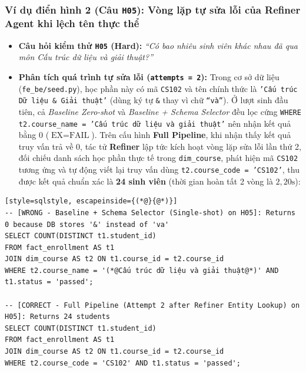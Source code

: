 \documentclass[12pt,a4paper]{report}
\begin{document}
\subsubsection{Ví dụ điển hình 2 (Câu \texttt{H05}): Vòng lặp tự sửa lỗi của Refiner Agent khi lệch tên thực thể}
\begin{itemize}
    \item \textbf{Câu hỏi kiểm thử \texttt{H05} (Hard):} \textit{``Có bao nhiêu sinh viên khác nhau đã qua môn Cấu trúc dữ liệu và giải thuật?''}
    \item \textbf{Phân tích quá trình tự sửa lỗi (\texttt{attempts = 2}):} Trong cơ sở dữ liệu (\texttt{fe\_be/seed.py}), học phần này có mã \texttt{CS102} và tên chính thức là \texttt{'Cấu trúc Dữ liệu \& Giải thuật'} (dùng ký tự \texttt{\&} thay vì chữ \texttt{``và''}). Ở lượt sinh đầu tiên, cả \textit{Baseline Zero-shot} và \textit{Baseline + Schema Selector} đều lọc cứng \texttt{WHERE t2.course\_name = 'Cấu trúc dữ liệu và giải thuật'} nên nhận kết quả bằng $0$ ($\text{EX} = \text{FAIL}$). Trên cấu hình \textbf{Full Pipeline}, khi nhận thấy kết quả truy vấn trả về $0$, tác tử \textbf{Refiner} lập tức kích hoạt vòng lặp sửa lỗi lần thứ 2, đối chiếu danh sách học phần thực tế trong \texttt{dim\_course}, phát hiện mã \texttt{CS102} tương ứng và tự động viết lại truy vấn dùng \texttt{t2.course\_code = 'CS102'}, thu được kết quả chuẩn xác là \textbf{24 sinh viên} (thời gian hoàn tất 2 vòng là $2{,}20\text{s}$):
\end{itemize}
\begin{lstlisting}[style=sqlstyle, escapeinside={(*@}{@*)}]
-- [WRONG - Baseline + Schema Selector (Single-shot) on H05]: Returns 0 because DB stores '&' instead of 'va'
SELECT COUNT(DISTINCT t1.student_id)
FROM fact_enrollment AS t1
JOIN dim_course AS t2 ON t1.course_id = t2.course_id
WHERE t2.course_name = '(*@Cấu trúc dữ liệu và giải thuật@*)' AND t1.status = 'passed';

-- [CORRECT - Full Pipeline (Attempt 2 after Refiner Entity Lookup) on H05]: Returns 24 students
SELECT COUNT(DISTINCT t1.student_id)
FROM fact_enrollment AS t1
JOIN dim_course AS t2 ON t1.course_id = t2.course_id
WHERE t2.course_code = 'CS102' AND t1.status = 'passed';
\end{lstlisting}
\end{document}
